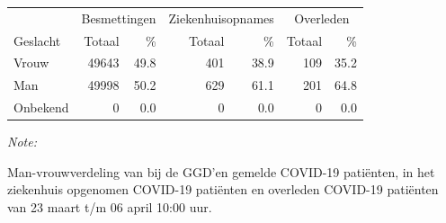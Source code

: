 \documentclass[
  english,
  man,floatsintext]{apa6}
\begin{document}
\begin{table}
\centering\begingroup\fontsize{11}{13}\selectfont

\begin{threeparttable}
\begin{tabular}{lrrrrrr}
\toprule
\multicolumn{1}{c}{ } & \multicolumn{2}{c}{Besmettingen} & \multicolumn{2}{c}{Ziekenhuisopnames} & \multicolumn{2}{c}{Overleden} \\
\cmidrule(l{3pt}r{3pt}){2-3} \cmidrule(l{3pt}r{3pt}){4-5} \cmidrule(l{3pt}r{3pt}){6-7}
Geslacht & Totaal & \% & Totaal & \% & Totaal & \%\\
\midrule
Vrouw & 49643 & 49.8 & 401 & 38.9 & 109 & 35.2\\
Man & 49998 & 50.2 & 629 & 61.1 & 201 & 64.8\\
Onbekend & 0 & 0.0 & 0 & 0.0 & 0 & 0.0\\
\bottomrule
\end{tabular}
\begin{tablenotes}
\item \textit{Note: } 
\item Man-vrouwverdeling van bij de GGD’en gemelde COVID-19 patiënten, in het ziekenhuis opgenomen COVID-19 patiënten en overleden COVID-19 patiënten van 23 maart t/m 06 april 10:00 uur.
\end{tablenotes}
\end{threeparttable}
\endgroup{}
\end{table}
\newpage
\end{document}
